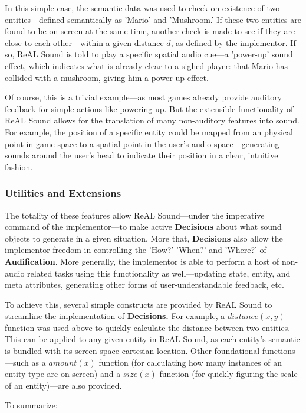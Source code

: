 \documentclass{report}
\newcommand{\rs}{ReAL Sound\xspace}
\newcommand{\state}[1]{\textbf{#1}}
\newcommand{\audio}{\textbf{Audification}\xspace}
\begin{document}
In this simple case, the semantic data was used to check on existence of two entities---defined semantically as 'Mario' and 'Mushroom.' If these two entities are found to be on-screen at the same time, another check is made to see if they are close to each other---within a given distance $d$, as defined by the implementor. If so, \rs is told to play a specific spatial audio cue---a 'power-up' sound effect, which indicates what is already clear to a sighed player: that Mario has collided with a mushroom, giving him a power-up effect.

Of course, this is a trivial example---as most games already provide auditory feedback for simple actions like powering up. But the extensible functionality of \rs allows for the translation of many non-auditory features into sound. For example, the position of a specific entity could be mapped from an physical point in game-space to a spatial point in the user's audio-space---generating sounds around the user's head to indicate their position in a clear, intuitive fashion.

\subsubsection{Utilities and Extensions}

The totality of these features allow \rs---under the imperative command of the implementor---to make active \state{Decisions} about what sound objects to generate in a given situation. More that, \state{Decisions} also allow the implementor freedom in controlling the 'How?' 'When?' and 'Where?' of \audio. More generally, the implementor is able to perform a host of non-audio related tasks using this functionality as well---updating state, entity, and meta attributes, generating other forms of user-understandable feedback, etc. 

To achieve this, several simple constructs are provided by \rs to streamline the implementation of \state{Decisions.} For example, a $distance(x, y)$ function was used above to quickly calculate the distance between two entities. This can be applied to any given entity in \rs, as each entity's semantic is bundled with its screen-space cartesian location. Other foundational functions---such as a $amount(x)$ function (for calculating how many instances of an entity type are on-screen) and a $size(x)$ function (for quickly figuring the scale of an entity)---are also provided.  

To summarize:
\end{document}
